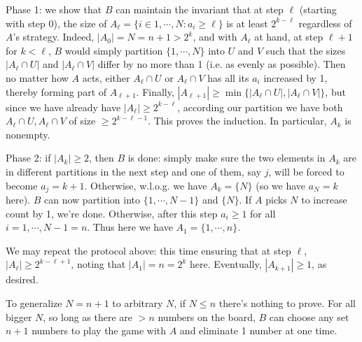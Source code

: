 \documentclass[11pt,a4paper]{article}
\begin{document}
\begin{enumerate}
		Phase 1: we show that $B$ can maintain the invariant that at step $\ell$ (starting with step 0), 
		the size of $A_{\ell}=\{i\in 1, \cdots, N: a_i\ge \ell\}$ is at least $2^{k-\ell}$ regardless of $A$'s strategy. 
		Indeed, $|A_0|=N=n+1>2^k$, 
		and with $A_{\ell}$ at hand, 
		at step $\ell+1$ for $k<\ell$, $B$ would simply partition $\{1, \cdots, N\}$ into $U$ and $V$ such that the sizes $|A_{\ell}\cap U|$ and $|A_{\ell}\cap V|$ differ by no more than 1
		(i.e. as evenly as possible). 
		Then no matter how $A$ acts, either $A_{\ell}\cap U$ or $A_{\ell}\cap V$ has all its $a_i$ increased by 1, 
		thereby forming part of $A_{\ell+1}$. 
		Finally, $|A_{\ell+1}|\ge \min \{|A_{\ell}\cap U|, |A_{\ell}\cap V|\}$, 
		but since we have already have $|A_{\ell}|\ge 2^{k-\ell}$, 
		according our partition we have both $A_{\ell}\cap U, A_{\ell}\cap V$ of size $\ge 2^{k-\ell-1}$. 
		This proves the induction. 
		In particular, $A_k$ is nonempty. 
		
		Phase 2: if $|A_k|\ge 2$, then $B$ is done: simply make sure the two elements in $A_k$ are in different partitions in the next step and one of them, say $j$, will be forced to become $a_j=k+1$. 
		Otherwise, w.l.o.g. we have $A_k=\{N\}$ (so we have $a_N=k$ here). 
		$B$ can now partition into $\{1, \cdots, N-1\}$ and $\{N\}$. 
		If $A$ picks $N$ to increase count by 1, we're done. 
		Otherwise, after this step $a_i\ge 1$ for all $i=1, \cdots, N-1=n$. 
		Thus here we have $A_1=\{1, \cdots, n\}$. 
		
		We may repeat the protocol above: this time ensuring that at step $\ell$, $|A_{\ell}|\ge 2^{k-\ell+1}$, noting that $|A_1|=n=2^k$ here. 
		Eventually, $|A_{k+1}|\ge 1$, as desired. 
		
		To generalize $N=n+1$ to arbitrary $N$, 
		if $N\le n$ there's nothing to prove. For all bigger $N$, 
		so long as there are $>n$ numbers on the board, 
		$B$ can choose any set $n+1$ numbers to play the game with $A$ and eliminate 1 number at one time. 
		

\end{enumerate}
\end{document}

